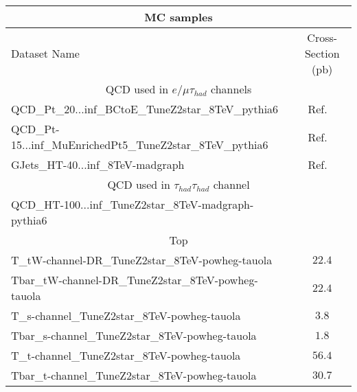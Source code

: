 \begin{table}[!Hhtb]
\begin{center}
\small{
\begin{tabular}{|l|c|}
\hline
\multicolumn{2}{|c|}{MC samples } \\
\hline
Dataset Name                                            & Cross-Section (pb)    \\
\hline
\multicolumn{2}{|c|}{QCD used in $e/\mu\tau_{had}$ channels }\\
\hline
QCD\_Pt\_20...inf\_BCtoE\_TuneZ2star\_8TeV\_pythia6                & Ref. ~\cite{Prep}\\ 
QCD\_Pt-15...inf\_MuEnrichedPt5\_TuneZ2star\_8TeV\_pythia6         & Ref. ~\cite{Prep}\\
GJets\_HT-40...inf\_8TeV-madgraph                                  & Ref. ~\cite{Prep}\\
\hline
\multicolumn{2}{|c|}{QCD used in $\tau_{had}\tau_{had}$ channel }\\
\hline
QCD\_HT-100...inf\_TuneZ2star\_8TeV-madgraph-pythia6            &\\
\hline

\multicolumn{2}{|c|}{Top }\\
\hline
T\_tW-channel-DR\_TuneZ2star\_8TeV-powheg-tauola       & $22.4$                \\
Tbar\_tW-channel-DR\_TuneZ2star\_8TeV-powheg-tauola    & $22.4$\\
T\_s-channel\_TuneZ2star\_8TeV-powheg-tauola           & $3.8$\\%
Tbar\_s-channel\_TuneZ2star\_8TeV-powheg-tauola        & $1.8$\\%
T\_t-channel\_TuneZ2star\_8TeV-powheg-tauola           & $56.4$\\
Tbar\_t-channel\_TuneZ2star\_8TeV-powheg-tauola        & $30.7$\\


\end{tabular}}
\end{center}
\end{table}
